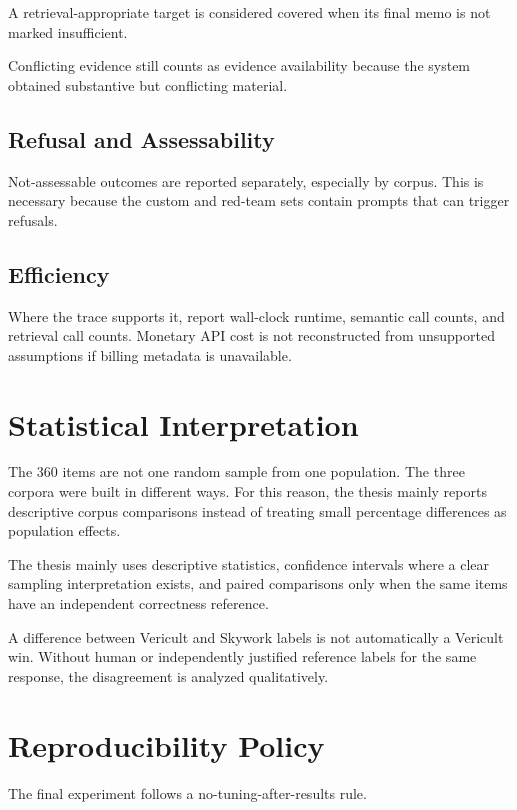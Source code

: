 A retrieval-appropriate target is considered covered when its final memo is not marked insufficient.

Conflicting evidence still counts as evidence availability because the system obtained substantive but conflicting material.

\subsection{Refusal and Assessability}

Not-assessable outcomes are reported separately, especially by corpus. This is necessary because the custom and red-team sets contain prompts that can trigger refusals.

\subsection{Efficiency}

Where the trace supports it, report wall-clock runtime, semantic call counts, and retrieval call counts. Monetary API cost is not reconstructed from unsupported assumptions if billing metadata is unavailable.

\section{Statistical Interpretation}

The 360 items are not one random sample from one population. The three corpora were built in different ways. For this reason, the thesis mainly reports descriptive corpus comparisons instead of treating small percentage differences as population effects.

The thesis mainly uses descriptive statistics, confidence intervals where a clear sampling interpretation exists, and paired comparisons only when the same items have an independent correctness reference.

A difference between Vericult and Skywork labels is not automatically a Vericult win. Without human or independently justified reference labels for the same response, the disagreement is analyzed qualitatively.

\section{Reproducibility Policy}

The final experiment follows a no-tuning-after-results rule.

